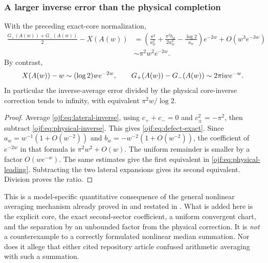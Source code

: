 \subsubsection{A larger inverse error than the physical completion}

\begin{corollary}
\label{ojf:cor:defect}
With the preceding exact-core normalization,
\begin{align}
 \frac{G_+(A(w))+G_-(A(w))}{2}-X(A(w))
 &=\left(\frac{\pi^2}{a_w^2}
       +\frac{\pi^2b_w}{2a_w^3}-\frac{\log2}{a_w}\right)e^{-2w}
             +O(w^3e^{-3w})                         \label{ojf:eq:defect-exact}\\
 &\sim\pi^2w^2e^{-2w}.                              \label{ojf:eq:defect-leading}
\end{align}
By contrast,
\begin{equation}\label{ojf:eq:physical-leading}
 X(A(w))-w\sim(\log2)we^{-2w},
 \qquad
 G_+(A(w))-G_-(A(w))\sim2\pi\mathrm{i} we^{-w}.
\end{equation}
In particular the inverse-average error divided by the physical
core-inverse correction tends to infinity, with equivalent
$\pi^2w/\log2$.
\end{corollary}
\begin{proof}
Average \eqref{ojf:eq:lateral-inverse}, using
$c_++c_-=0$ and $c_\pm^2=-\pi^2$, then subtract
\eqref{ojf:eq:physical-inverse}. This gives
\eqref{ojf:eq:defect-exact}. Since
$a_w=w^{-1}(1+O(w^{-2}))$ and
$b_w=-w^{-2}(1+O(w^{-2}))$, the coefficient of $e^{-2w}$ in that
formula is $\pi^2w^2+O(w)$.
The uniform remainder is smaller by a factor $O(we^{-w})$.
The same estimates give the first equivalent in
\eqref{ojf:eq:physical-leading}. Subtracting the two lateral
expansions gives its second equivalent. Division proves the ratio.
\end{proof}

This is a model-specific quantitative consequence of the general
nonlinear averaging mechanism already proved in \cite{ojf:transport}
and restated in \cite{qfb:reports}. What is added here is the explicit
core, the exact second-sector coefficient, a uniform convergent chart,
and the separation by an unbounded factor from the physical correction.
It is \emph{not} a counterexample to a correctly formulated nonlinear
median summation. Nor does it allege that either cited repository article
confused arithmetic averaging with such a summation.

